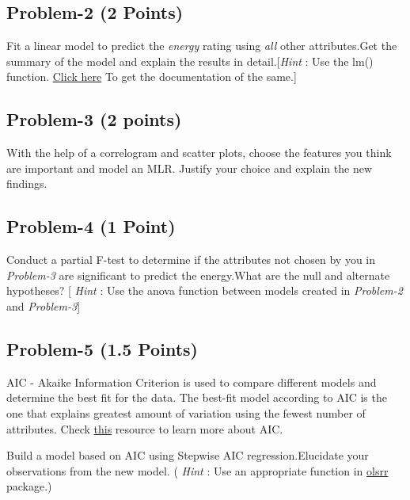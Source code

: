 \documentclass[
]{article}
\begin{document}
\hypertarget{problem-2-2-points}{%
\subsection{Problem-2 (2 Points)}\label{problem-2-2-points}}

Fit a linear model to predict the \emph{energy} rating using \emph{all}
other attributes.Get the summary of the model and explain the results in
detail.{[}\emph{Hint} : Use the lm() function.
\href{https://www.rdocumentation.org/packages/stats/versions/3.6.2/topics/lm}{Click
here} To get the documentation of the same.{]}

\hypertarget{problem-3-2-points}{%
\subsection{Problem-3 (2 points)}\label{problem-3-2-points}}

With the help of a correlogram and scatter plots, choose the features
you think are important and model an MLR. Justify your choice and
explain the new findings.

\hypertarget{problem-4-1-point}{%
\subsection{Problem-4 (1 Point)}\label{problem-4-1-point}}

Conduct a partial F-test to determine if the attributes not chosen by
you in \emph{Problem-3} are significant to predict the energy.What are
the null and alternate hypotheses? {[} \emph{Hint} : Use the anova
function between models created in \emph{Problem-2} and
\emph{Problem-3}{]}

\hypertarget{problem-5-1.5-points}{%
\subsection{Problem-5 (1.5 Points)}\label{problem-5-1.5-points}}

AIC - Akaike Information Criterion is used to compare different models
and determine the best fit for the data. The best-fit model according to
AIC is the one that explains greatest amount of variation using the
fewest number of attributes. Check
\href{https://www.scribbr.com/statistics/akaike-information-criterion/}{this}
resource to learn more about AIC.

Build a model based on AIC using Stepwise AIC regression.Elucidate your
observations from the new model. ( \emph{Hint} : Use an appropriate
function in
\href{https://www.rdocumentation.org/packages/olsrr/versions/0.5.3}{olsrr}
package.)
\end{document}
